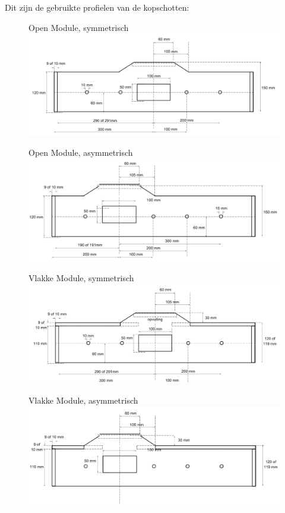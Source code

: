 \documentclass[12pt,a4paper]{report}
\begin{document}
Dit zijn de gebruikte profielen van de kopschotten:

\begin{figure}[ht]
  \captionbox
  {Open Module, symmetrisch}
  {\includegraphics[scale=0.25]{images/rcu_open_sym}}
\end{figure}

\begin{figure}[ht]
  \captionbox
  {Open Module, asymmetrisch}
  {\includegraphics[scale=0.25]{images/rcu_open_asym}}
\end{figure}

\begin{figure}[ht]
  \captionbox
  {Vlakke Module, symmetrisch}
  {\includegraphics[scale=0.25]{images/rcu_vlak_sym}}
\end{figure}

\begin{figure}[ht]
  \captionbox
  {Vlakke Module, asymmetrisch}
  {\includegraphics[scale=0.25]{images/rcu_vlak_asym}}
\end{figure}
\end{document}
